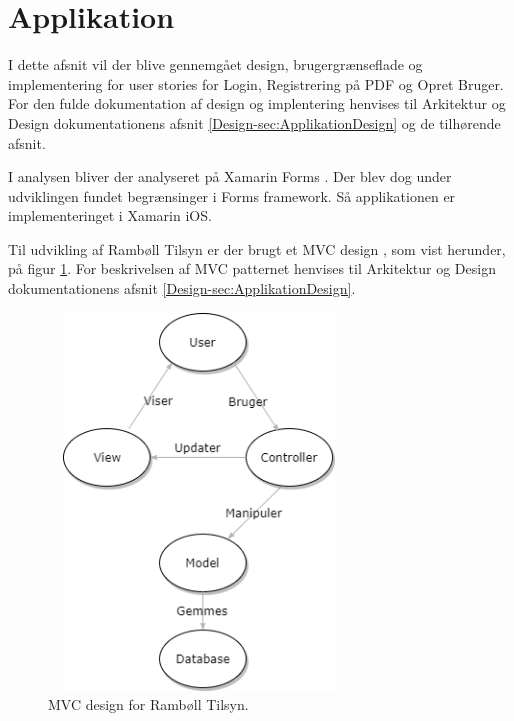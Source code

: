 \section{Applikation}
I dette afsnit vil der blive gennemgået design, brugergrænseflade og implementering for user stories for Login, Registrering på PDF og Opret Bruger. For den fulde dokumentation af design og implentering henvises til Arkitektur og Design dokumentationens afsnit \ref{Design-sec:ApplikationDesign} og de tilhørende afsnit.

I analysen bliver der analyseret på Xamarin Forms \cite{Forms}. Der blev dog under udviklingen fundet begrænsinger i Forms framework. Så applikationen er implementeringet i Xamarin iOS.

Til udvikling af Rambøll Tilsyn er der brugt et MVC design \cite{MVC}, som vist herunder, på figur \ref{fig:MVC}. For beskrivelsen af MVC patternet henvises til Arkitektur og Design dokumentationens afsnit \ref{Design-sec:ApplikationDesign}.
\begin{figure}[H] %
	\centering
	\includegraphics[height=10cm, width=8cm]{Design/Applikation/MVC}
	\caption{MVC design for Rambøll Tilsyn.}
	\label{fig:MVC}
\end{figure}

\clearpage




